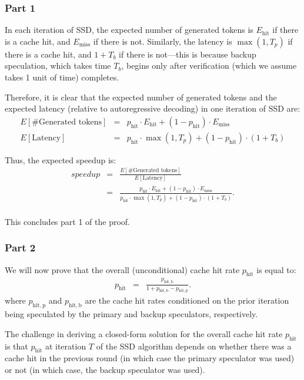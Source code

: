 \subsubsection{Part 1}
In each iteration of SSD, the expected number of generated tokens is $E_{\mathrm{hit}}$ if there is a cache hit, and $E_{\mathrm{miss}}$ if there is not.
Similarly, the latency is $\max(1, T_p)$ if there is a cache hit, and $1+T_b$ if there is not---this is because backup speculation, which takes time $T_b$, begins only after verification (which we assume takes 1 unit of time) completes.

Therefore, it is clear that the expected number of generated tokens and the expected latency (relative to autoregressive decoding) in one iteration of SSD are:
\begin{eqnarray*}
    E[\text{\# Generated tokens}] &=& p_{\mathrm{hit}} \cdot E_{\mathrm{hit}} + (1-p_{\mathrm{hit}}) \cdot E_{\mathrm{miss}} \\
    E[\text{Latency}] &=& p_{\mathrm{hit}} \cdot \max(1, T_p) + (1-p_{\mathrm{hit}}) \cdot (1 + T_b)
\end{eqnarray*}

Thus, the expected speedup is:
\begin{eqnarray*}
speedup &=&  \frac{E[\text{\# Generated tokens}]}{E[\text{Latency}]} \\
&=&\frac{p_{\mathrm{hit}} \cdot E_{\mathrm{hit}} + (1-p_{\mathrm{hit}}) \cdot E_{\mathrm{miss}}}{p_{\mathrm{hit}} \cdot \max(1, T_p) + (1-p_{\mathrm{hit}}) \cdot (1 + T_b)}. \\
\end{eqnarray*}

This concludes part 1 of the proof.

\subsubsection{Part 2}
We will now prove that the overall (unconditional) cache hit rate $p_{\mathrm{hit}}$ is equal to:
\begin{eqnarray*}
\label{thm:phit}
p_{\mathrm{hit}} &=& \frac{p_{\mathrm{hit,b}}}{1 + p_{\mathrm{hit,b}} - p_{\mathrm{hit,p}} }.
\end{eqnarray*}
where $p_{\mathrm{hit,p}}$ and $p_{\mathrm{hit,b}}$ are the cache hit rates conditioned on the prior iteration being speculated by the primary and backup speculators, respectively.

The challenge in deriving a closed-form solution for the overall cache hit rate $p_{\mathrm{hit}}$ is that $p_{\mathrm{hit}}$ at iteration $T$ of the SSD algorithm depends on whether there was a cache hit in the previous round (in which case the primary speculator was used) or not (in which case, the backup speculator was used). \\

